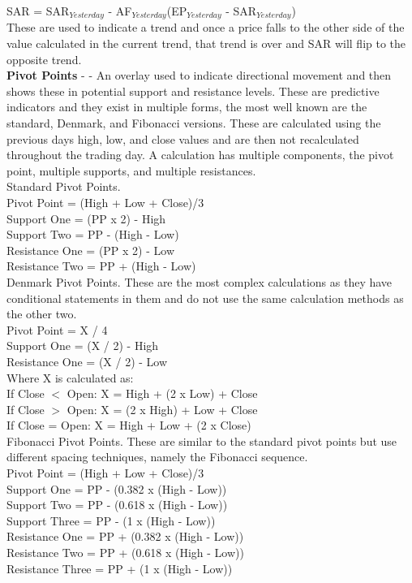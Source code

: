 \documentclass[conference]{IEEEtran}
\begin{document}
\noindent
SAR = SAR$_{Yesterday}$ - AF$_{Yesterday}$(EP$_{Yesterday}$ - SAR$_{Yesterday}$) \\

\noindent
These are used to indicate a trend and once a price falls to the other side of the value calculated in the current trend, that trend is over and SAR will flip to the opposite trend. \\

\iffalse
[]
\fi

\noindent
\textbf{Pivot Points} - \cite{Murphy1999} - An overlay used to indicate directional movement and then shows these in potential support and resistance levels. These are predictive indicators and they exist in multiple forms, the most well known are the standard, Denmark, and Fibonacci versions. These are calculated using the previous days high, low, and close values and are then not recalculated throughout the trading day. A calculation has multiple components, the pivot point, multiple supports, and multiple resistances.\\

\noindent
Standard Pivot Points. \\
Pivot Point = (High + Low + Close)/3\\
Support One = (PP x 2) - High\\
Support Two = PP - (High - Low)\\
Resistance One = (PP x 2) - Low\\
Resistance Two = PP + (High - Low)\\

\noindent
Denmark Pivot Points. These are the most complex calculations as they have conditional statements in them and do not use the same calculation methods as the other two.\\
Pivot Point = X / 4\\
Support One = (X / 2) - High\\
Resistance One = (X / 2) - Low\\

\noindent
Where X is calculated as: \\
If Close $<$ Open: X = High + (2 x Low) + Close\\
If Close $>$ Open: X = (2 x High) + Low + Close\\
If Close = Open: X = High + Low + (2 x Close)\\

\noindent
Fibonacci Pivot Points. These are similar to the standard pivot points but use different spacing techniques, namely the Fibonacci sequence.\\
Pivot Point = (High + Low + Close)/3\\
Support One = PP - (0.382 x (High  -  Low))\\
Support Two = PP - (0.618 x (High  -  Low))\\
Support Three = PP - (1 x (High  -  Low))\\
Resistance One = PP + (0.382 x (High  -  Low))\\
Resistance Two = PP + (0.618 x (High  -  Low))\\
Resistance Three = PP + (1 x (High  -  Low))\\
\end{document}
